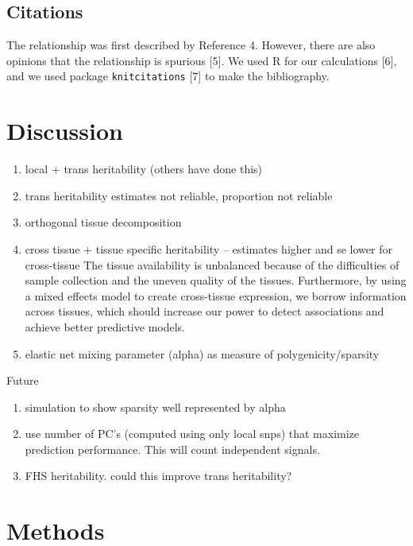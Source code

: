 \documentclass[]{article}
\begin{document}
\subsection{Citations}\label{citations}

The relationship was first described by Reference 4. However, there are
also opinions that the relationship is spurious {[}5{]}. We used R for
our calculations {[}6{]}, and we used package \texttt{knitcitations}
{[}7{]} to make the bibliography.

\section{Discussion}\label{discussion}

\begin{enumerate}
\def\labelenumi{\arabic{enumi}.}
\itemsep1pt\parskip0pt
\item
  local + trans heritability (others have done this)
\item
  trans heritability estimates not reliable, proportion not reliable
\item
  orthogonal tissue decomposition
\item
  cross tissue + tissue specific heritability -- estimates higher and se
  lower for cross-tissue The tissue availability is unbalanced because
  of the difficulties of sample collection and the uneven quality of the
  tissues. Furthermore, by using a mixed effects model to create
  cross-tissue expression, we borrow information across tissues, which
  should increase our power to detect associations and achieve better
  predictive models.
\item
  elastic net mixing parameter (alpha) as measure of
  polygenicity/sparsity
\end{enumerate}

Future

\begin{enumerate}
\def\labelenumi{\arabic{enumi}.}
\itemsep1pt\parskip0pt
\item
  simulation to show sparsity well represented by alpha
\item
  use number of PC's (computed using only local snps) that maximize
  prediction performance. This will count independent signals.
\item
  FHS heritability. could this improve trans heritability?
\end{enumerate}

\section{Methods}\label{methods}
\end{document}
